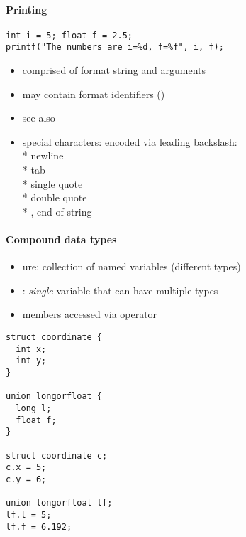 \paragraph{Printing}
\begin{lstlisting}[style=customc]
int i = 5; float f = 2.5;
printf("The numbers are i=%d, f=%f", i, f);
\end{lstlisting}
\begin{itemize}
  \item comprised of format string and arguments
  \item may contain format identifiers ()
  \item see also 
  \item \underline{special characters}: encoded via leading backslash: \\*
    \code{\\n} newline \\*
    \code{\\t} tab \\*
     single quote \\*
     double quote \\*
     , end of string
\end{itemize}

\paragraph{Compound data types}
\begin{itemize}
  \item {}ure: collection of named variables (different types)
  \item {}: \emph{single} variable that can have multiple types
  \item members accessed via  operator
\end{itemize}
\begin{lstlisting}[style=customc]
struct coordinate {
  int x;
  int y;
}

union longorfloat {
  long l;
  float f;
}

struct coordinate c;
c.x = 5;
c.y = 6;

union longorfloat lf;
lf.l = 5;
lf.f = 6.192;
\end{lstlisting}

